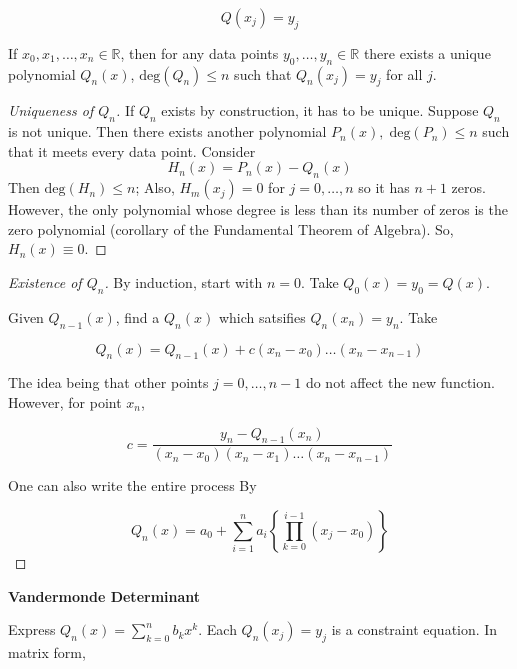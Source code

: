 \[Q(x_j)=y_j\]

\begin{theorem} 
If $x_0,x_1,\hdots,x_n \in \mathbb{R}$, then for any data points $y_0,\hdots,y_n \in \mathbb{R}$ there exists a unique polynomial $Q_n(x)$, $\mathrm{deg}(Q_n)\leq n$ such that $Q_n(x_j) = y_j$ for all $j$.
\end{theorem}

\begin{proof}[Uniqueness of $Q_n$]
    If $Q_n$ exists by construction, it has to be unique. Suppose $Q_n$ is not unique. Then there exists another polynomial $P_n(x),\; \mathrm{deg}(P_n) \leq n$ such that it meets every data point. Consider
    \[H_n(x) = P_n(x) - Q_n(x)\]
    Then $\mathrm{deg}(H_n)\leq n$; Also, $H_m(x_j)=0$ for $j=0,\hdots,n$ so it has $n+1$ zeros. However, the only polynomial whose degree is less than its number of zeros is the zero polynomial (corollary of the Fundamental Theorem of Algebra). So, $H_n(x) \equiv 0$.
\end{proof}

\begin{proof}[Existence of $Q_n$]
   By induction, start with $n=0$. Take $Q_0(x) = y_0 = Q(x)$.
   
   Given $Q_{n-1}(x)$, find a $Q_n(x)$ which satsifies $Q_n(x_n) = y_n$. Take

   \[Q_n(x) = Q_{n-1}(x) + c(x_n-x_0)\hdots(x_n-x_{n-1})\] 

   The idea being that other points $j=0,\hdots,n-1$ do not affect the new function. However, for point $x_n$,

   \[c = \frac{y_n - Q_{n-1}(x_n)}{(x_n-x_0)(x_n-x_1)\hdots(x_n-x_{n-1})}\]

   One can also write the entire process By

   \begin{equation} 
       Q_n(x) = a_0 + \sum^n_{i=1}a_i\left\{\prod_{k=0}^{i-1}(x_j-x_0) \right\}
   \end{equation}
\end{proof}

\textbf{Vandermonde Determinant}

Express $Q_n(x) = \sum^n_{k=0}b_kx^k$. Each $Q_n(x_j)=y_j$ is a constraint equation. In matrix form,

